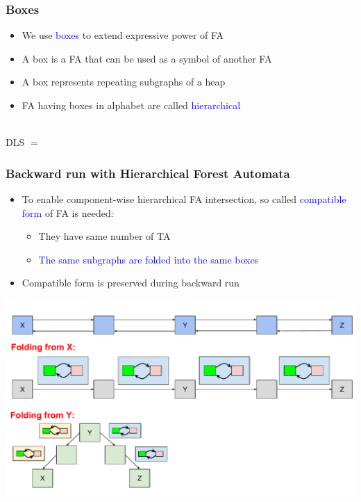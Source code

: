\documentclass{beamer}
\newcommand{\hlbl}[1]{\textcolor{blue}{#1}}
\begin{document}
\begin{frame}
\frametitle{Boxes}

\begin{itemize}
		\item We use \hlbl{boxes} to extend expressive power of FA
		\item A box is a FA that can be used as a symbol of another FA
		\item A box represents repeating subgraphs of a heap
		\item FA having boxes in alphabet are called \hlbl{hierarchical}
	\end{itemize}
		\vspace{-0.8cm}
		\centering \\
		\vspace{0.7cm}
		\centering DLS $=$ \\
		\vspace{-0.8cm}
		\centering 
\end{frame}



\begin{frame}
\frametitle{Backward run with Hierarchical Forest Automata}
	
		   	\begin{itemize}
				\item To enable component-wise hierarchical FA intersection,
					so called \hlbl{compatible form} of FA is needed:
				\begin{itemize}
					\item They have same number of TA
					\item \hlbl{The same subgraphs are folded into the same boxes}
				\end{itemize}
				\item Compatible form is preserved during backward run
			\end{itemize}

	\begin{center}
		\includegraphics[scale=0.4]{ex/cp.pdf}
	\end{center}

\end{frame}
\end{document}
